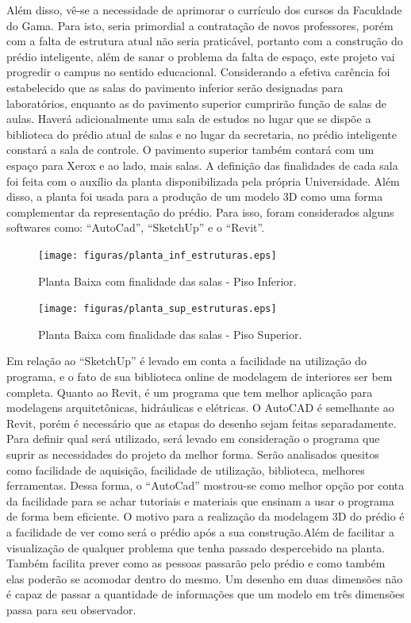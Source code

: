 Além disso, vê-se a necessidade de aprimorar o currículo dos cursos da Faculdade do Gama. Para isto, seria primordial a contratação de novos professores, porém com a falta de estrutura atual não seria praticável, portanto com a construção do prédio inteligente, além de sanar o problema da falta de espaço, este projeto vai progredir o campus no sentido educacional.
Considerando a efetiva carência foi estabelecido que as salas do pavimento inferior serão designadas para laboratórios, enquanto as do pavimento superior cumprirão função de salas de aulas. Haverá adicionalmente uma sala de estudos no lugar que se dispõe a biblioteca do prédio atual de salas e no lugar da secretaria, no prédio inteligente constará a sala de controle. O pavimento superior também contará com um espaço para Xerox e ao lado, mais salas.
A definição das finalidades de cada sala foi feita com o auxílio da planta disponibilizada pela própria Universidade. Além disso, a planta foi usada para a produção de um modelo 3D como uma forma complementar da representação do prédio. Para isso, foram considerados alguns softwares como: “AutoCad”, “SketchUp” e o “Revit”.

\begin{figure}[!h]
  \centering
  \texttt{[image: figuras/planta\_inf\_estruturas.eps]}
  \caption{Planta Baixa com finalidade das salas - Piso Inferior.}
  \label{fig:planta_inf_estruturas}
\end{figure}

\begin{figure}[!h]
  \centering
  \texttt{[image: figuras/planta\_sup\_estruturas.eps]}
  \caption{Planta Baixa com finalidade das salas - Piso Superior.}
  \label{fig:planta_sup_estruturas}
\end{figure}

Em relação ao “SketchUp” é levado em conta a facilidade na utilização do programa, e o fato de sua biblioteca online de modelagem de interiores ser bem completa. Quanto ao Revit, é um programa que tem melhor aplicação para modelagens arquitetônicas, hidráulicas e elétricas. O AutoCAD é semelhante ao Revit, porém é necessário que as etapas do desenho sejam feitas separadamente. Para definir qual será utilizado, será levado em consideração o programa que suprir as necessidades do projeto da melhor forma. Serão analisados quesitos como facilidade de aquisição, facilidade de utilização, biblioteca, melhores ferramentas. Dessa forma, o “AutoCad” mostrou-se como melhor opção por conta da facilidade para se achar tutoriais e materiais que ensinam a usar o programa de forma bem eficiente.
O motivo para a realização da modelagem 3D do prédio é a facilidade de ver como será o prédio após a sua construção.Além de facilitar a visualização de qualquer problema que tenha passado despercebido na planta. Também facilita prever como as pessoas passarão pelo prédio e como também elas poderão se acomodar dentro do mesmo. Um desenho em duas dimensões não é capaz de passar a quantidade de informações que um modelo em três dimensões passa para seu observador.

